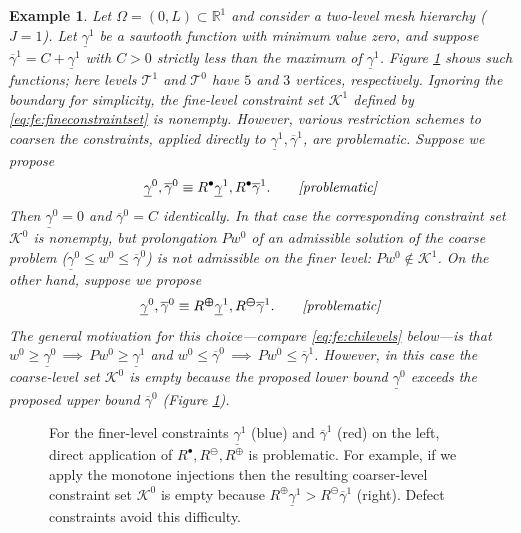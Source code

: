 \documentclass[letterpaper,final,12pt,reqno]{amsart}
\theoremstyle{cstyle}
\theoremstyle{cstyle*}
\theoremstyle{dstyle}
\newtheorem{example}[theorem]{Example}
\numberwithin{equation}{section}
\numberwithin{figure}{section}
\numberwithin{table}{section}
\numberwithin{theorem}{section}
\newcommand{\RR}{\mathbb{R}}
\newcommand{\maxR}{R^{\bm{\oplus}}}
\newcommand{\minR}{R^{\bm{\ominus}}}
\newcommand{\iR}{R^{\bullet}}
\newcommand{\pef}[1]{\todo[inline, color=red!20]{PF: #1}}
\begin{document}
\begin{example}  \label{ex:directRbad}  
Let $\Omega = (0,L) \subset \RR^1$ and consider a two-level mesh hierarchy ($J=1$).  Let $\underline{\gamma}^1$ be a sawtooth function with minimum value zero, and suppose $\overline{\gamma}^1=C+\underline{\gamma}^1$ with $C>0$ strictly less than the maximum of $\underline{\gamma}^1$.  Figure \ref{fig:directRbad} shows such functions; here levels $\mathcal{T}^1$ and $\mathcal{T}^0$ have $5$ and $3$ vertices, respectively.  Ignoring the boundary for simplicity, the fine-level constraint set $\mathcal{K}^1$ defined by \eqref{eq:fe:fineconstraintset} is nonempty.  However, various restriction schemes to coarsen the constraints, applied directly to $\underline{\gamma}^1,\overline{\gamma}^1$, are problematic.  Suppose we propose
    $$\underline{\gamma}^0, \overline{\gamma}^0 \equiv \iR \underline{\gamma}^1, \iR \overline{\gamma}^1. \qquad \text{\emph{[problematic]}}$$
Then $\underline{\gamma}^0=0$ and $\overline{\gamma}^0=C$ identically.  In that case the corresponding constraint set $\mathcal{K}^0$ is nonempty, but prolongation $Pw^0$ of an admissible solution of the coarse problem ($\underline{\gamma}^0 \le w^0 \le \overline{\gamma}^0$) is not admissible on the finer level: $Pw^0 \notin \mathcal{K}^1$.  On the other hand, suppose we propose
    $$\underline{\gamma}^0, \overline{\gamma}^0 \equiv \maxR \underline{\gamma}^1, \minR \overline{\gamma}^1. \qquad \text{\emph{[problematic]}}$$
The general motivation for this choice---compare \eqref{eq:fe:chilevels} below---is that $w^0 \ge \underline{\gamma}^0 \, \implies \, Pw^0 \ge \underline{\gamma}^1$ and $w^0 \le \overline{\gamma}^0 \, \implies \, Pw^0 \le \overline{\gamma}^1$.  However, in this case the coarse-level set $\mathcal{K}^0$ is empty because the proposed lower bound $\underline{\gamma}^0$ exceeds the proposed upper bound $\overline{\gamma}^0$ (Figure \ref{fig:directRbad}).
\end{example}

\begin{figure}[ht]

\quad

\caption{For the finer-level constraints $\underline{\gamma}^1$ (blue) and $\overline{\gamma}^1$ (red) on the left, direct application of $\iR,\minR,\maxR$ is problematic.  For example, if we apply the monotone injections then the resulting coarser-level constraint set $\mathcal{K}^0$ is empty because $\maxR \underline{\gamma}^1 > \minR \overline{\gamma}^1$ (right).  Defect constraints avoid this difficulty.}
\label{fig:directRbad}
\end{figure}
\end{document}
